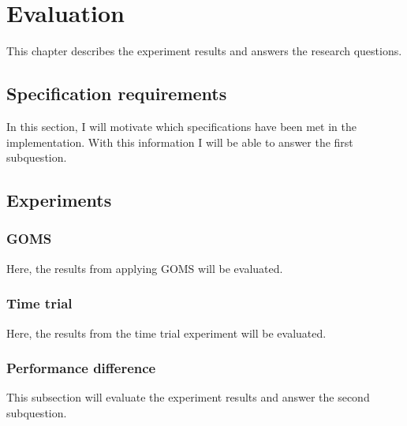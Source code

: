 \chapter{Evaluation}
\label{chapter:evaluation}
This chapter describes the experiment results and answers the research questions.

\section{Specification requirements}
\label{section:specificationrequirements}
In this section, I will motivate which specifications have been met in the implementation. With this information I will be able to answer the first subquestion.

\section{Experiments}
\label{section:experiments_evaluation}

\subsection{GOMS}
\label{subsection:goms_evaluation}
Here, the results from applying GOMS will be evaluated.

\subsection{Time trial}
\label{subsection:timetrial_evaluation}
Here, the results from the time trial experiment will be evaluated.

\subsection{Performance difference}
\label{subsection:performancedifference}
This subsection will evaluate the experiment results and answer the second subquestion.
